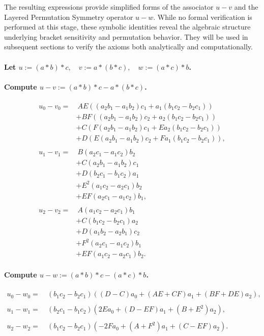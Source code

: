 \documentclass[12pt]{article}
\theoremstyle{definition}
\theoremstyle{plain}
\theoremstyle{remark}
\begin{document}
The resulting expressions provide simplified forms of the associator \( u - v \) and the Layered Permutation Symmetry operator \( u - w \). While no formal verification is performed at this stage, these symbolic identities reveal the algebraic structure underlying bracket sensitivity and permutation behavior. They will be used in subsequent sections to verify the axioms both analytically and computationally.

\paragraph{Let \( u := (a * b) * c, \quad v := a * (b * c), \quad w := (a * c) * b \).}

\paragraph{Compute \( u - v := (a * b) * c - a * (b * c) \).}
\begin{align*}
u_0 - v_0 =&\ AE ((a_2 b_1 - a_1 b_2) c_1 + a_1 (b_1 c_2 - b_2 c_1)) \\
&+ BF ((a_2 b_1 - a_1 b_2) c_2 + a_2 (b_1 c_2 - b_2 c_1)) \\
&+ C (F (a_2 b_1 - a_1 b_2) c_1 + E a_2 (b_1 c_2 - b_2 c_1)) \\
&+ D (E (a_2 b_1 - a_1 b_2) c_2 + F a_1 (b_1 c_2 - b_2 c_1)), \\
\\
u_1 - v_1 =&\ B(a_2 c_1 - a_1 c_2) b_2 \\
&+ C (a_2 b_1 - a_1 b_2) c_1 \\
&+ D (b_2 c_1 - b_1 c_2) a_1 \\
&+ E^2 (a_1 c_2 - a_2 c_1) b_2 \\
&+ EF (a_2 c_1 - a_1 c_2) b_1, \\
\\
u_2 - v_2 =&\ A(a_1 c_2 - a_2 c_1) b_1 \\
&+ C (b_1 c_2 - b_2 c_1) a_2 \\
&+ D (a_1 b_2 - a_2 b_1) c_2 \\
&+ F^2 (a_2 c_1 - a_1 c_2) b_1 \\
&+ EF (a_1 c_2 - a_2 c_1) b_2.
\end{align*}

\paragraph{Compute \( u - w := (a * b) * c - (a * c) * b \).}
\begin{align*}
u_0 - w_0 =&\ (b_1 c_2 - b_2 c_1) \left( (D - C) a_0 + (AE + CF) a_1 + (BF + DE) a_2 \right), \\
\\
u_1 - w_1 =&\ (b_2 c_1 - b_1 c_2) \left( 2 E a_0 + (D - EF) a_1 + (B + E^2) a_2 \right), \\
\\
u_2 - w_2 =&\ (b_1 c_2 - b_2 c_1) \left( -2 F a_0 + (A + F^2) a_1 + (C - EF) a_2 \right).
\end{align*}
\end{document}

